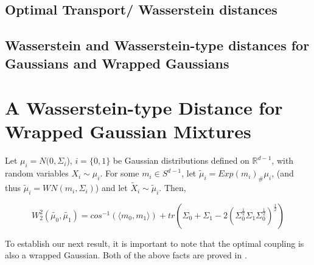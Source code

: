\documentclass[]{article}
\begin{document}
\subsection{Optimal Transport/ Wasserstein distances}

\subsection{Wasserstein and Wasserstein-type distances for Gaussians and Wrapped Gaussians}

\section{A Wasserstein-type Distance for Wrapped Gaussian Mixtures}\label{section: wrapped gaussian mixture wasserstein-type distance}


Let $\mu_i = N(0,\Sigma_i$), $i = \{0,1\}$ be Gaussian distributions defined on $\mathbb{R}^{d-1}$, with random variables $X_i \sim \mu_i$. For some $m_i \in S^{d-1}$, let $\tilde{\mu}_i = Exp(m_i)_\#\mu_i$, (and thus $\tilde{\mu}_i = WN(m_i, \Sigma_i)$)   and let $\tilde{X}_i \sim \tilde{\mu}_i$. Then, 


\begin{equation*}
	W_2^2(\tilde{\mu_0},\tilde{\mu_1}) = cos^{-1}( \langle m_0, m_1 \rangle ) + tr(\Sigma_0 + \Sigma_1 - 2(\Sigma_0^{\frac{1}{2}}\Sigma_1\Sigma_0^{\frac{1}{2}})^{\frac{1}{2}})
\end{equation*} 

To establish our next result, it is important to note that the optimal coupling is also a wrapped Gaussian. Both of the above facts are proved in \cite{WGOT}.
\end{document}
